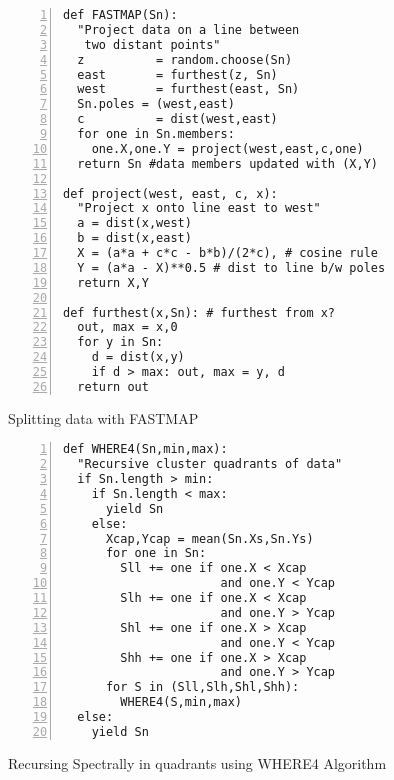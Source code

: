 \documentclass[11pt,twocolumn]{article}
\begin{document}
\thispagestyle{empty}



\begin{figure}[!b]
\begin{center}
\begin{lstlisting}[mathescape,frame=l,numbers=left]
def FASTMAP(Sn): 
  "Project data on a line between 
   two distant points"
  z          = random.choose(Sn)
  east       = furthest(z, Sn)
  west       = furthest(east, Sn)
  Sn.poles = (west,east)
  c          = dist(west,east)     
  for one in Sn.members: 
    one.X,one.Y = project(west,east,c,one)
  return Sn #data members updated with (X,Y)

def project(west, east, c, x): 
  "Project x onto line east to west"
  a = dist(x,west)
  b = dist(x,east)
  X = (a*a + c*c - b*b)/(2*c), # cosine rule
  Y = (a*a - X)**0.5 # dist to line b/w poles
  return X,Y
         
def furthest(x,Sn): # furthest from x?
  out, max = x,0
  for y in Sn:
    d = dist(x,y)
    if d > max: out, max = y, d
  return out

\end{lstlisting}
\end{center}
\caption{Splitting data with FASTMAP}
\label{fig:FASTMAP}   
\end{figure}


\begin{figure}[!b]
\begin{center}
\begin{lstlisting}[mathescape,frame=l,numbers=left]
def WHERE4(Sn,min,max):
  "Recursive cluster quadrants of data"
  if Sn.length > min: 
    if Sn.length < max:
      yield Sn
    else:
      Xcap,Ycap = mean(Sn.Xs,Sn.Ys)
      for one in Sn:
        Sll += one if one.X < Xcap 
                      and one.Y < Ycap
        Slh += one if one.X < Xcap 
                      and one.Y > Ycap
        Shl += one if one.X > Xcap 
                      and one.Y < Ycap
        Shh += one if one.X > Xcap 
                      and one.Y > Ycap
      for S in (Sll,Slh,Shl,Shh): 
        WHERE4(S,min,max)
  else:
    yield Sn
\end{lstlisting}
\end{center}
\caption{Recursing Spectrally in quadrants using WHERE4 Algorithm}
\label{fig:WHERE4}   
\end{figure}
\end{document}
